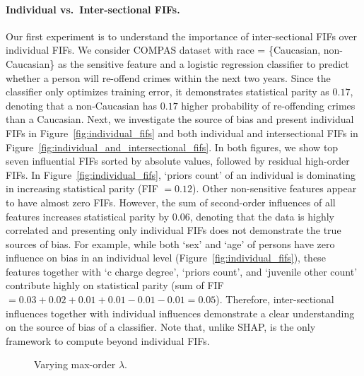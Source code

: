 \paragraph{Individual vs.\ Inter-sectional FIFs.} Our first experiment is to understand the importance of inter-sectional FIFs over individual FIFs. We consider COMPAS dataset with race = \{Caucasian, non-Caucasian\} as the sensitive feature and a logistic regression classifier to predict whether a person will re-offend crimes within the next two years. Since the classifier only optimizes training error, it demonstrates statistical parity as $ 0.17 $, denoting that a non-Caucasian  has $ 0.17 $ higher probability of re-offending crimes than a Caucasian. Next, we investigate the source of bias and present individual FIFs in Figure~\ref{fig:individual_fifs} and both individual and intersectional FIFs in Figure~\ref{fig:individual_and_intersectional_fifs}. In both figures, we show top seven influential FIFs sorted by absolute values, followed by residual high-order FIFs. In Figure~\ref{fig:individual_fifs}, `priors count' of an individual is dominating in increasing statistical parity (FIF $ = 0.12 $). Other non-sensitive features appear to have almost zero FIFs. However, the sum of second-order influences of all features increases statistical parity by $ 0.06 $, denoting that the data is highly correlated and presenting only individual FIFs does not demonstrate the true sources of bias. For example, while both `sex' and `age' of persons have zero influence on bias in an individual level (Figure~\ref{fig:individual_fifs}), these features together with `c charge degree', `priors count', and `juvenile other count' contribute highly on statistical parity (sum of FIF $ = 0.03 + 0.02 + 0.01 + 0.01 - 0.01 - 0.01 = 0.05$). Therefore, inter-sectional influences together with individual influences demonstrate a clear understanding on the source of bias of a classifier. Note that, unlike SHAP, {\framework} is the only framework to compute beyond individual FIFs.









\begin{figure}
	\centering
	\caption{Varying max-order $ \lambda $.}
	\label{fig:varying_max_order}
\end{figure}

